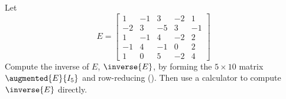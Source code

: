 Let
%
\begin{equation*}
E=\begin{bmatrix}
1 & -1 & 3 & -2 & 1\\
-2 & 3 & -5 & 3 & -1\\
1 & -1 & 4 & -2 & 2\\
-1 & 4 & -1 & 0 & 2\\
1 & 0 & 5 & -2 & 4
\end{bmatrix}
\end{equation*}
%
Compute the inverse of $E$, $\inverse{E}$, by forming the $5\times 10$ matrix $\augmented{E}{I_5}$ and row-reducing ().  Then use a calculator to compute $\inverse{E}$ directly.
